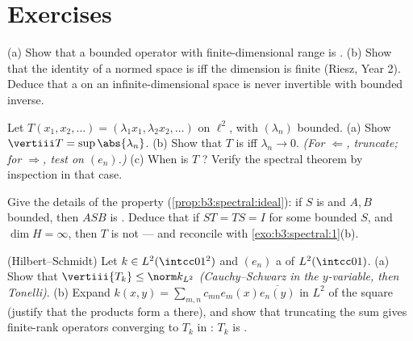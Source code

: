 \section{Exercises}

\begin{exercise}[$\star$]\label{exo:b3:spectral:1}
(a) Show that a bounded operator with finite-dimensional range
is .
(b) Show that the identity of a normed space is  iff
the dimension is finite (Riesz, Year 2). Deduce that a  on an infinite-dimensional space is never invertible
with bounded inverse.
\end{exercise}

\begin{exercise}[$\star$]\label{exo:b3:spectral:2}
Let $T(x_1, x_2, \dots) = (\lambda_1x_1, \lambda_2x_2, \dots)$
on $\ell^2$, with $(\lambda_n)$ bounded.
(a) Show $\vertiii T = \sup\abs{\lambda_n}$.
(b) Show that $T$ is  iff $\lambda_n \to 0$.
\emph{(For $\Leftarrow$, truncate; for $\Rightarrow$, test on
$(e_n)$.)}
(c) When is $T$ ? Verify the spectral theorem by
inspection in that case.
\end{exercise}

\begin{exercise}[$\star\star$]\label{exo:b3:spectral:3}
Give the details of the  property
(\cref{prop:b3:spectral:ideal}): if $S$ is  and $A, B$
bounded, then $ASB$ is . Deduce that if $ST = TS = I$
for some bounded $S$, and $\dim H = \infty$, then $T$ is not
 --- and reconcile with \cref{exo:b3:spectral:1}(b).
\end{exercise}

\begin{exercise}[$\star\star$]\label{exo:b3:spectral:4}
(Hilbert--Schmidt) Let $k \in L^2(\intcc01^2)$ and $(e_n)$ a
 of $L^2(\intcc01)$.
(a) Show that $\vertiii{T_k} \leq \norm k_{L^2}$
\emph{(Cauchy--Schwarz in the $y$-variable, then Tonelli)}.
(b) Expand $k(x,y) = \sum_{m,n}c_{mn}e_m(x)\overline{e_n(y)}$
in $L^2$ of the square (justify that the products form a
 there), and show that truncating the sum gives
finite-rank operators converging to $T_k$ in :
$T_k$ is .
\end{exercise}

